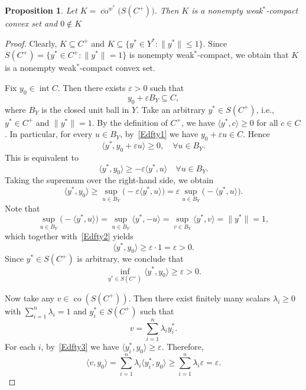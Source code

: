 \documentclass[10pt,a4paper]{amsart}
\newtheorem{proposition}{Proposition}[section]
\begin{document}
\begin{proposition}   \label{RDCxl}   
	Let $K = \overline{\operatorname{co}}^{w^*}\big(S(C^+)\big)$. Then $K$ is a nonempty weak$^*$-compact convex set  and  $0 \notin K$ 
   \end{proposition}
\begin{proof}  
Clearly, $K \subseteq C^+$ and  $K \subseteq \{y^*\in Y^*:\|y^*\|  \leq 1\}$.
Since $S(C^+)=\{y^*\in C^+:\|y^*\|=1\}$ is nonempty weak$^*$-compact, we obtain that $K$ is a nonempty weak$^*$-compact convex set.  

Fix \(y_0 \in \operatorname{int} C\). Then  there exists \(\varepsilon > 0\) such that
\begin{equation}\label{Edfty1}
	y_0 + \varepsilon B_Y \subseteq C,
\end{equation}
where \(B_Y \) is the closed unit ball in \(Y\).
Take an arbitrary \(y^* \in S(C^+)\), i.e., \(y^* \in C^+\) and \(\|y^*\| = 1\). By the definition of \(C^+\), we have \(\langle y^*, c \rangle \ge 0\) for all \(c \in C\).
In particular, for every \(u \in B_Y\), by~\eqref{Edfty1} we have \(y_0 + \varepsilon u \in C\). Hence
\[
\langle y^*, y_0 + \varepsilon u \rangle \ge 0, \quad \forall u \in B_Y.
\]
This is equivalent to
\[
\langle y^*, y_0 \rangle \ge -\varepsilon \langle y^*, u \rangle \quad \forall u \in B_Y.
\]
Taking the supremum over the right-hand side, we obtain
\begin{equation}\label{Edfty2}
	\langle y^*, y_0 \rangle \ge \sup_{u \in B_Y} \bigl(-\varepsilon \langle y^*, u \rangle\bigr)
	= \varepsilon \sup_{u \in B_Y} \bigl(-\langle y^*, u \rangle\bigr).
\end{equation}
Note that
\[
\sup_{u \in B_Y} \bigl(-\langle y^*, u \rangle\bigr) = \sup_{u \in B_Y} \langle y^*, -u \rangle = \sup_{v \in B_Y} \langle y^*, v \rangle = \|y^*\| = 1,
\]
which together with~\eqref{Edfty2} yields
\[
\langle y^*, y_0 \rangle \ge \varepsilon \cdot 1 = \varepsilon > 0.
\]
Since \(y^* \in S(C^+)\) is arbitrary, we conclude that
\begin{equation}\label{Edfty3}
	\inf_{y^* \in S(C^+)} \langle y^*, y_0 \rangle \ge \varepsilon > 0.
\end{equation}

Now take any \(v \in \operatorname{co}(S(C^+))\). Then there exist finitely many scalars \(\lambda_i \ge 0\) with \(\sum_{i=1}^n \lambda_i = 1\) and \(y_i^* \in S(C^+)\) such that
\[
v = \sum_{i=1}^n \lambda_i y_i^*.
\]
For each \(i\), by~\eqref{Edfty3} we have \(\langle y_i^*, y_0 \rangle \ge \varepsilon\). Therefore,
\begin{equation}\label{Edfty4}
	\langle v, y_0 \rangle = \sum_{i=1}^n \lambda_i \langle y_i^*, y_0 \rangle \ge \sum_{i=1}^n \lambda_i \varepsilon = \varepsilon.
\end{equation}


\end{proof}
\end{document}
